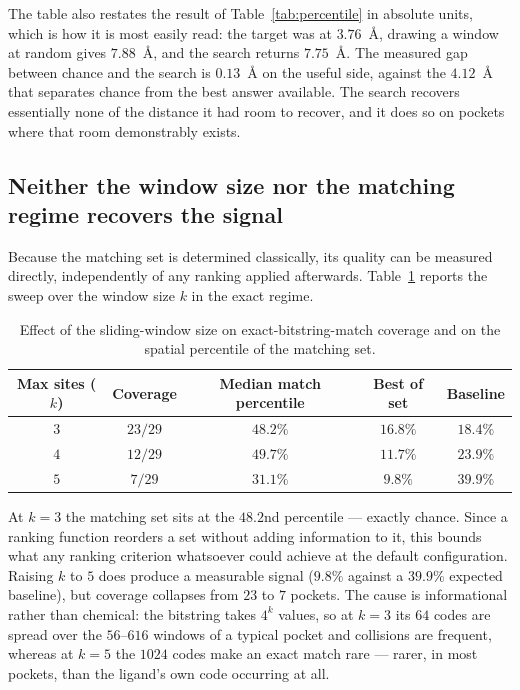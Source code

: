 The table also restates the result of Table~\ref{tab:percentile} in absolute units,
which is how it is most easily read: the target was at $3.76$~\AA{}, drawing a window at
random gives $7.88$~\AA{}, and the search returns $7.75$~\AA{}. The measured gap between
chance and the search is $0.13$~\AA{} on the useful side, against the $4.12$~\AA{} that
separates chance from the best answer available. The search recovers essentially none of
the distance it had room to recover, and it does so on pockets where that room
demonstrably exists.

\subsection{Neither the window size nor the matching regime recovers the signal}
\label{sec:res-sweep}

Because the matching set is determined classically, its quality can be measured
directly, independently of any ranking applied afterwards. Table~\ref{tab:ksweep}
reports the sweep over the window size $k$ in the exact regime.

\begin{table}[htbp]
\centering
\caption{Effect of the sliding-window size on exact-bitstring-match coverage and on the
spatial percentile of the matching set.}
\label{tab:ksweep}
\begin{tabular}{ccccc}
\toprule
\textbf{Max sites ($k$)} & \textbf{Coverage} & \textbf{Median match percentile} & \textbf{Best of set} & \textbf{Baseline} \\
\midrule
$3$ & $23/29$ & $48.2\%$ & $16.8\%$ & $18.4\%$ \\
$4$ & $12/29$ & $49.7\%$ & $11.7\%$ & $23.9\%$ \\
$5$ & $7/29$  & $31.1\%$ & $9.8\%$  & $39.9\%$ \\
\bottomrule
\end{tabular}
\end{table}

At $k=3$ the matching set sits at the $48.2$nd percentile --- exactly chance. Since a
ranking function reorders a set without adding information to it, this bounds what any
ranking criterion whatsoever could achieve at the default configuration. Raising $k$ to
$5$ does produce a measurable signal ($9.8\%$ against a $39.9\%$ expected baseline),
but coverage collapses from $23$ to $7$ pockets. The cause is informational rather than
chemical: the bitstring takes $4^k$ values, so at $k=3$ its $64$ codes are spread over
the $56$--$616$ windows of a typical pocket and collisions are frequent, whereas at
$k=5$ the $1024$ codes make an exact match rare --- rarer, in most pockets, than the
ligand's own code occurring at all.

